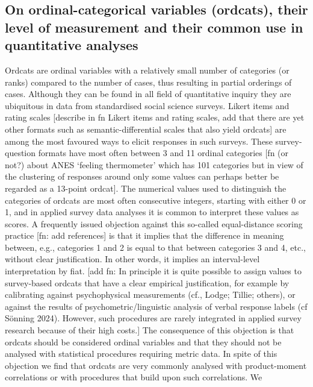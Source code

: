 \documentclass[
  12pt,
]{article}
\theoremstyle{plain}
\theoremstyle{definition}
\theoremstyle{remark}
\begin{document}
\subsection{On ordinal-categorical variables (ordcats), their level of
measurement and their common use in quantitative
analyses}\label{on-ordinal-categorical-variables-ordcats-their-level-of-measurement-and-their-common-use-in-quantitative-analyses}

Ordcats are ordinal variables with a relatively small number of
categories (or ranks) compared to the number of cases, thus resulting in
partial orderings of cases. Although they can be found in all field of
quantitative inquiry they are ubiquitous in data from standardised
social science surveys. Likert items and rating scales {[}describe in fn
Likert items and rating scales, add that there are yet other formats
such as semantic-differential scales that also yield ordcats{]} are
among the most favoured ways to elicit responses in such surveys. These
survey-question formats have most often between 3 and 11 ordinal
categories {[}fn (or not?) about ANES `feeling thermometer' which has
101 categories but in view of the clustering of responses around only
some values can perhaps better be regarded as a 13-point ordcat{]}. The
numerical values used to distinguish the categories of ordcats are most
often consecutive integers, starting with either 0 or 1, and in applied
survey data analyses it is common to interpret these values as scores. A
frequently issued objection against this so-called equal-distance
scoring practice {[}fn: add references{]} is that it implies that the
difference in meaning between, e.g., categories 1 and 2 is equal to that
between categories 3 and 4, etc., without clear justification. In other
words, it implies an interval-level interpretation by fiat. {[}add fn:
In principle it is quite possible to assign values to survey-based
ordcats that have a clear empirical justification, for example by
calibrating against psychophysical measurements (cf., Lodge; Tillie;
others), or against the results of psychometric/linguistic analysis of
verbal response labels (cf Sönning 2024). However, such procedures are
rarely integrated in applied survey research because of their high
costs.{]} The consequence of this objection is that ordcats should be
considered ordinal variables and that they should not be analysed with
statistical procedures requiring metric data. In spite of this objection
we find that ordcats are very commonly analysed with product-moment
correlations or with procedures that build upon such correlations. We
\end{document}
